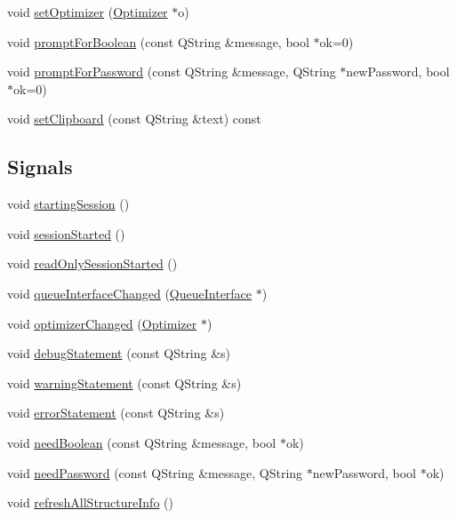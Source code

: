 \begin{DoxyCompactItemize}
\item 
void \hyperlink{classGlobalSearch_1_1OptBase_addd46a192c8a68553a12b30d18246f1e}{set\-Optimizer} (\hyperlink{classGlobalSearch_1_1Optimizer}{Optimizer} $\ast$o)
\item 
void \hyperlink{classGlobalSearch_1_1OptBase_a3460f008a4a3cc3f8d00b3c0cd531069}{prompt\-For\-Boolean} (const Q\-String \&message, bool $\ast$ok=0)
\item 
void \hyperlink{classGlobalSearch_1_1OptBase_a934195fac431de2882383b0483505c95}{prompt\-For\-Password} (const Q\-String \&message, Q\-String $\ast$new\-Password, bool $\ast$ok=0)
\item 
void \hyperlink{classGlobalSearch_1_1OptBase_a3a509ee5a0aa4d8021dcb2d1bc34f1c1}{set\-Clipboard} (const Q\-String \&text) const 
\end{DoxyCompactItemize}
\subsection*{Signals}
\begin{DoxyCompactItemize}
\item 
void \hyperlink{classGlobalSearch_1_1OptBase_ac8b7b372d127a2ba9fada95645b4b4c7}{starting\-Session} ()
\item 
void \hyperlink{classGlobalSearch_1_1OptBase_a7d786f0cf4c5e95ea0b35e3b3c9eb87e}{session\-Started} ()
\item 
void \hyperlink{classGlobalSearch_1_1OptBase_a3d614aba63df12ea0e42e2b5cb0fe050}{read\-Only\-Session\-Started} ()
\item 
void \hyperlink{classGlobalSearch_1_1OptBase_ac1e2aa7f7dc57461fd12ff47b25e7c5c}{queue\-Interface\-Changed} (\hyperlink{classGlobalSearch_1_1QueueInterface}{Queue\-Interface} $\ast$)
\item 
void \hyperlink{classGlobalSearch_1_1OptBase_a8f07729ab8372e2a41de0d38d7947c6a}{optimizer\-Changed} (\hyperlink{classGlobalSearch_1_1Optimizer}{Optimizer} $\ast$)
\item 
void \hyperlink{classGlobalSearch_1_1OptBase_aa194f330e51154ce95a6cabb7fa4fccc}{debug\-Statement} (const Q\-String \&s)
\item 
void \hyperlink{classGlobalSearch_1_1OptBase_a70a45deb53ed3dbd6a1c2c458ea88afe}{warning\-Statement} (const Q\-String \&s)
\item 
void \hyperlink{classGlobalSearch_1_1OptBase_a6bcbb9a259f9173084e2f4a82ffa0b86}{error\-Statement} (const Q\-String \&s)
\item 
void \hyperlink{classGlobalSearch_1_1OptBase_a771c4b00f1fd857750ccb3d48116334d}{need\-Boolean} (const Q\-String \&message, bool $\ast$ok)
\item 
void \hyperlink{classGlobalSearch_1_1OptBase_aa140b7676a1fee73e1d416c164232fb3}{need\-Password} (const Q\-String \&message, Q\-String $\ast$new\-Password, bool $\ast$ok)
\item 
void \hyperlink{classGlobalSearch_1_1OptBase_a3d04c32b50632a6745cc013cf91d2551}{refresh\-All\-Structure\-Info} ()
\end{DoxyCompactItemize}

